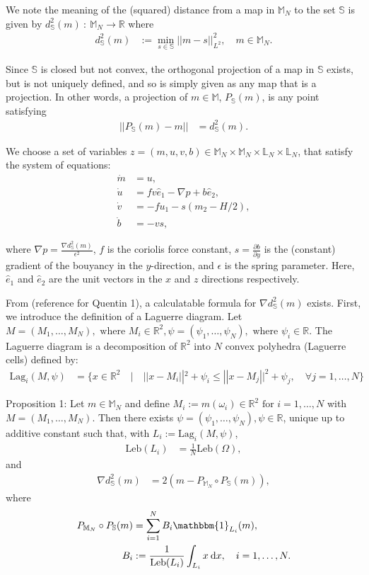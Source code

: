 \documentclass[11pt, oneside]{article}   	%
\newcommand{\R}{\mathbb{R}}
\newcommand{\MN}{\mathbb{M}_N}
\newcommand{\LN}{\mathbb{L}_N}
\newcommand{\dsmsq}{d^{2}_{\mathbb{S}}(m)}
\newcommand{\graddsmsq}{\nabla{d^{2}_{\mathbb{S}}(m)}}
\newcommand{\eone}{\hat{e}_1}
\newcommand{\etwo}{\hat{e}_2}
\newcommand{\Leb}{\mathrm{Leb}}
\begin{document}
We note the meaning of the (squared) distance from a map in \(\MN\) to the set \(\mathbb{S}\) is given by \(\dsmsq \: : \: \MN \to \R\) where
\begin{align}
\dsmsq &:= \min_{s \in \mathbb{S}} || m - s || ^2_{L^2}, \quad m \in \MN.
\end{align}

Since \(\mathbb{S}\) is closed but not convex, the orthogonal projection of a map in \(\mathbb{S}\) exists, but is not uniquely defined, and so is simply given as any map that is a projection. In other words, a projection of \(m \in \mathbb{M}\), \(P_\mathbb{S}(m)\), is any point satisfying
\begin{align}
|| P_\mathbb{S}(m) - m || &= \dsmsq.
\end{align}

We choose a set of variables \(z = (m, u, v, b) \in \MN \times \MN \times \LN \times \LN\), that satisfy the system of equations:
\begin{align} 
\dot{m} &= u, \\
\dot{u} &= f v \eone - \nabla p + b \etwo, \\
\dot{v} &= - f u_1 - s(m_2 - H/2), \\
\dot{b} &=  -vs,
\end{align}

where \(\nabla p = \frac{\graddsmsq}{\epsilon^2}\),  \(f\) is the coriolis force constant, \(s = \frac{\partial{b}}{\partial{y}}\) is the (constant) gradient of the bouyancy in the \(y\)-direction, and \(\epsilon\) is the spring parameter. Here, \(\eone\) and \(\etwo\) are the unit vectors in the \(x\) and \(z\) directions respectively.

From (reference for Quentin 1), a calculatable formula for \(\graddsmsq\) exists. First, we introduce the definition of a Laguerre diagram. Let \(M = (M_1,\dots,M_N), \text{ where } M_i \in \R^2, \psi = (\psi_1,\dots,\psi_N), \text{ where } \psi_i \in \R\). The Laguerre diagram is a decomposition of \(\R^2\) into \(N\) convex polyhedra (Laguerre cells) defined by:
\begin{align}
\mathrm{Lag}_i(M, \psi) &= \{x \in \R^2 \quad | \quad || x - M_i ||^2 + \psi_i \le || x - M_j ||^2 + \psi_j, \quad \forall j = 1,\dots,N\}
\end{align}

Proposition 1: Let \(m \in \MN\) and define \(M_i := m(\omega_i) \in \R^2 \text{ for } i = 1,\dots,N\) with \(M = (M_1,\dots,M_N)\). Then there exists \(\psi = (\psi_1,\dots,\psi_N), \psi \in \R\), unique up to additive constant such that, with \(L_i := \mathrm{Lag}_i(M, \psi)\), 
\begin{align}
\Leb(L_i) &= \frac{1}{N}\Leb(\Omega),
\end{align}
and
\begin{align}
\graddsmsq &= 2(m - P_{\MN} \circ P_{\mathbb{S}}(m)),
\end{align}
where
\begin{align}
P_{\MN} \circ P_{\mathbb{S}}(m) &= \sum^N_{i=1} B_i \mathbbm{1}_{L_i}(m), \\
B_i &:= \frac{1}{\Leb(L_i)} \int_{L_i} x \: \mathrm{d}x, \quad i = 1,\dots,N. 
\end{align}
\end{document}
